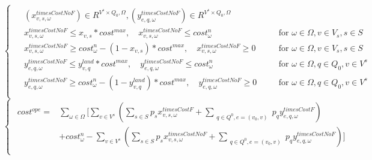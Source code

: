 \documentclass[a4paper,12pt]{article}
\begin{document}
    \begin{equation}
        \begin{cases}
            \begin{alignedat}{2}
                & (x_{v,s,\omega}^{timesCostNoF}) \in R^{V^{s} \times Q_{0}, \Omega}, (y_{e,q,\omega}^{timesCostNoF}) \in R^{V^{s} \times Q_{0}, \Omega} \\
                & x_{v,s,\omega}^{timesCostNoF} \leq x_{v,s}*cost^{max}, \quad x_{v,s,\omega}^{timesCostNoF} \leq cost_{\omega} ^n && \text{for } \omega \in\Omega, v \in V_{s}, s \in S\\
                & x_{v,s,\omega}^{timesCostNoF} \geq cost_{\omega} ^n - (1-x_{v,s})*cost^{max}, \quad x_{v,s,\omega}^{timesCostNoF} \geq 0 && \text{for } \omega \in\Omega, v \in V_{s}, s \in S\\
                & y_{e,q,\omega}^{timesCostNoF} \leq y_{v,q}^{land} * cost^{max}, \quad y_{e,q,\omega}^{timesCostNoF} \leq cost_{\omega} ^n \quad && \text{for } \omega \in \Omega, q \in Q_{0}, v \in V^{s} \\
                & y_{e,q,\omega}^{timesCostNoF} \geq cost_{\omega} ^n -(1-y_{v,q}^{land})*cost^{max}, \quad  y_{e,q,\omega}^{timesCostNoF} \geq 0 \quad && \text{for } \omega \in\Omega, q \in Q_{0}, v \in V^{s}\\
            \end{alignedat}
        \end{cases}
    \end{equation}
    \begin{equation}
        \begin{cases}
            \begin{alignedat}{2}
                cost^{ope} = & \sum_{\omega \in \Omega} \lbrack \sum_{v \in V^s} ( \sum_{s \in S} p_s x_{v,s,\omega}^{timesCostF} + \sum_{\substack{q \in Q^0, e = (v_0, v)}} p_q y_{e,q,\omega}^{timesCostF} ) \\
                &+ cost^n_{\omega} - \sum_{v \in V^s} ( \sum_{s \in S} p_s x_{v,s,\omega}^{timesCostNoF} + \sum_{\substack{q \in Q^{0}, e = (v_0, v)}} p_q y_{e,q,\omega}^{timesCostNoF} ) \rbrack \\ 
            \end{alignedat}
        \end{cases}
    \end{equation}
\end{document}
